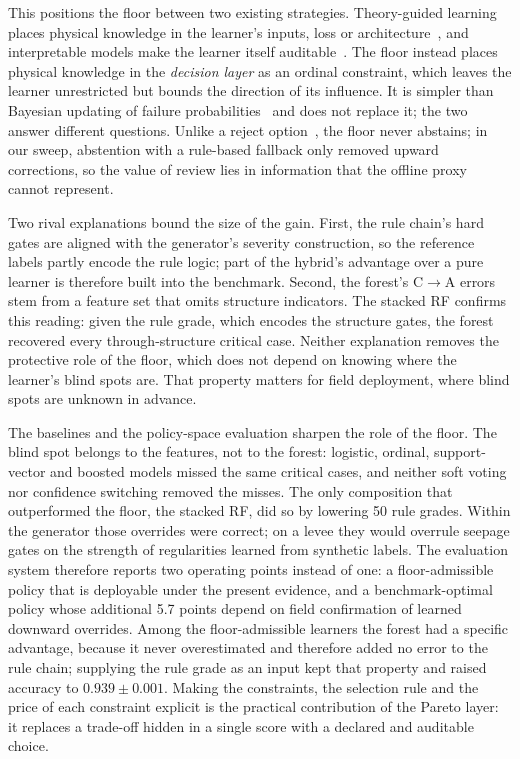 \documentclass[journal]{IEEEtran}
\newcommand{\CtoA}{C$\rightarrow$A}
\begin{document}
This positions the floor between two existing strategies. Theory-guided learning places physical knowledge in the learner's inputs, loss or architecture~\cite{Karpatne2017}, and interpretable models make the learner itself auditable~\cite{Rudin2019}. The floor instead places physical knowledge in the \emph{decision layer} as an ordinal constraint, which leaves the learner unrestricted but bounds the direction of its influence. It is simpler than Bayesian updating of failure probabilities~\cite{Schweckendiek,Roscoe} and does not replace it; the two answer different questions. Unlike a reject option~\cite{Chow1970,Geifman2017}, the floor never abstains; in our sweep, abstention with a rule-based fallback only removed upward corrections, so the value of review lies in information that the offline proxy cannot represent.

Two rival explanations bound the size of the gain. First, the rule chain's hard gates are aligned with the generator's severity construction, so the reference labels partly encode the rule logic; part of the hybrid's advantage over a pure learner is therefore built into the benchmark. Second, the forest's \CtoA{} errors stem from a feature set that omits structure indicators. The stacked RF confirms this reading: given the rule grade, which encodes the structure gates, the forest recovered every through-structure critical case. Neither explanation removes the protective role of the floor, which does not depend on knowing where the learner's blind spots are. That property matters for field deployment, where blind spots are unknown in advance.

The baselines and the policy-space evaluation sharpen the role of the floor. The blind spot belongs to the features, not to the forest: logistic, ordinal, support-vector and boosted models missed the same critical cases, and neither soft voting nor confidence switching removed the misses. The only composition that outperformed the floor, the stacked RF, did so by lowering 50 rule grades. Within the generator those overrides were correct; on a levee they would overrule seepage gates on the strength of regularities learned from synthetic labels. The evaluation system therefore reports two operating points instead of one: a floor-admissible policy that is deployable under the present evidence, and a benchmark-optimal policy whose additional 5.7 points depend on field confirmation of learned downward overrides. Among the floor-admissible learners the forest had a specific advantage, because it never overestimated and therefore added no error to the rule chain; supplying the rule grade as an input kept that property and raised accuracy to $0.939\pm0.001$. Making the constraints, the selection rule and the price of each constraint explicit is the practical contribution of the Pareto layer: it replaces a trade-off hidden in a single score with a declared and auditable choice.
\end{document}
